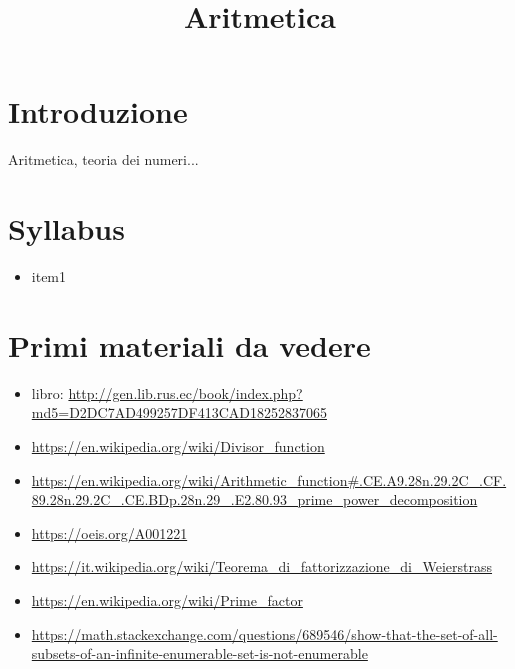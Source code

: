 \documentclass[a4paper,10pt]{article}
\title{Aritmetica}
\begin{document}
\maketitle


\section{Introduzione}
Aritmetica, teoria dei numeri...
\section{Syllabus}
\begin{itemize}
 \item item1
\end{itemize}

\section{Primi materiali da vedere}
\begin{itemize}
 \item libro: \url{http://gen.lib.rus.ec/book/index.php?md5=D2DC7AD499257DF413CAD18252837065}
 \item \url{https://en.wikipedia.org/wiki/Divisor_function}
 \item \url{https://en.wikipedia.org/wiki/Arithmetic_function#.CE.A9.28n.29.2C_.CF.89.28n.29.2C_.CE.BDp.28n.29_.E2.80.93_prime_power_decomposition}
 \item \url{https://oeis.org/A001221}
 \item \url{https://it.wikipedia.org/wiki/Teorema_di_fattorizzazione_di_Weierstrass}
 \item \url{https://en.wikipedia.org/wiki/Prime_factor}
 \item \url{https://math.stackexchange.com/questions/689546/show-that-the-set-of-all-subsets-of-an-infinite-enumerable-set-is-not-enumerable}
\end{itemize}
\end{document}
